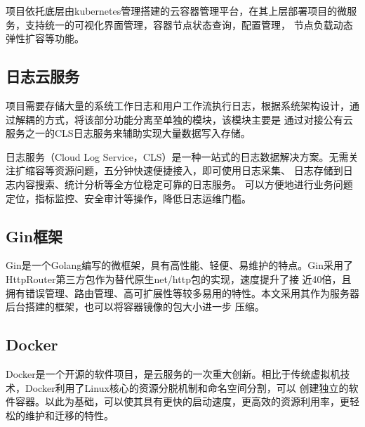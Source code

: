 项目依托底层由kubernetes管理搭建的云容器管理平台，在其上层部署项目的微服务，支持统一的可视化界面管理，容器节点状态查询，配置管理，
节点负载动态弹性扩容等功能\cite{Tuli_2022}。

\subsection{日志云服务}
项目需要存储大量的系统工作日志和用户工作流执行日志，根据系统架构设计，通过解耦的方式，将该部分功能分离至单独的模块，该模块主要是
通过对接公有云服务之一的CLS日志服务来辅助实现大量数据写入存储\cite{othe1}。

日志服务（Cloud Log Service，CLS）是一种一站式的日志数据解决方案。无需关注扩缩容等资源问题，五分钟快速便捷接入，即可使用日志采集、
日志存储到日志内容搜索、统计分析等全方位稳定可靠的日志服务。 可以方便地进行业务问题定位，指标监控、安全审计等操作，降低日志运维门槛。

\subsection{Gin框架}
Gin是一个Golang编写的微框架，具有高性能、轻便、易维护的特点。Gin采用了HttpRouter第三方包作为替代原生net/http包的实现，速度提升了接
近40倍，且拥有错误管理、路由管理、高可扩展性等较多易用的特性。本文采用其作为服务器后台搭建的框架，也可以将容器镜像的包大小进一步
压缩。

\subsection{Docker}
Docker是一个开源的软件项目，是云服务的一次重大创新。相比于传统虚拟机技术，Docker利用了Linux核心的资源分脱机制和命名空间分割，可以
创建独立的软件容器。以此为基础，可以使其具有更快的启动速度，更高效的资源利用率，更轻松的维护和迁移的特性。


%
%
%



